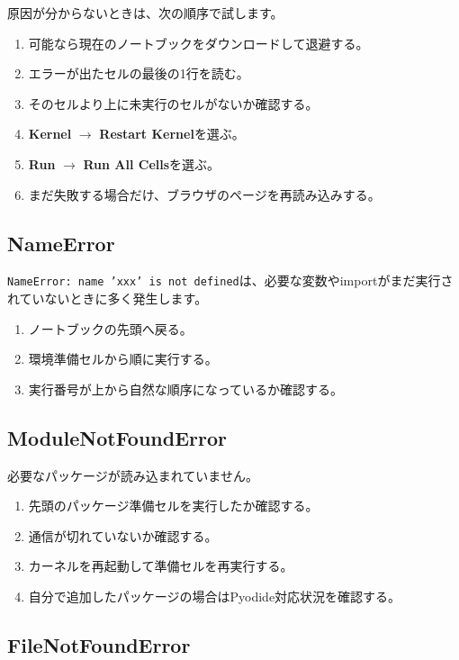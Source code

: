 \documentclass[a4paper,11pt]{ltjsarticle}
\newcommand{\menu}[1]{\textsf{\bfseries #1}}
\begin{document}
原因が分からないときは、次の順序で試します。

\begin{enumerate}
  \item 可能なら現在のノートブックをダウンロードして退避する。
  \item エラーが出たセルの最後の1行を読む。
  \item そのセルより上に未実行のセルがないか確認する。
  \item \menu{Kernel} $\rightarrow$ \menu{Restart Kernel}を選ぶ。
  \item \menu{Run} $\rightarrow$ \menu{Run All Cells}を選ぶ。
  \item まだ失敗する場合だけ、ブラウザのページを再読み込みする。
\end{enumerate}

\subsection{NameError}

\texttt{NameError: name 'xxx' is not defined}は、必要な変数やimportがまだ実行されていないときに多く発生します。

\begin{errorbox}
\begin{enumerate}
  \item ノートブックの先頭へ戻る。
  \item 環境準備セルから順に実行する。
  \item 実行番号が上から自然な順序になっているか確認する。
\end{enumerate}
\end{errorbox}

\subsection{ModuleNotFoundError}

必要なパッケージが読み込まれていません。

\begin{enumerate}
  \item 先頭のパッケージ準備セルを実行したか確認する。
  \item 通信が切れていないか確認する。
  \item カーネルを再起動して準備セルを再実行する。
  \item 自分で追加したパッケージの場合はPyodide対応状況を確認する。
\end{enumerate}

\subsection{FileNotFoundError}
\end{document}

